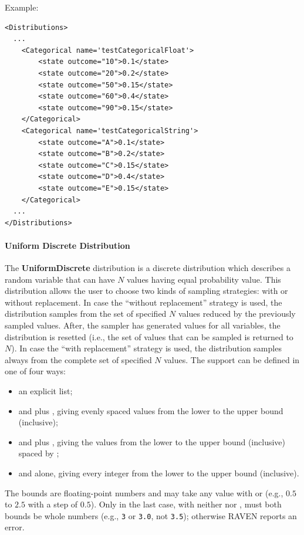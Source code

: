 Example:
\begin{lstlisting}[style=XML]
<Distributions>
  ...
    <Categorical name='testCategoricalFloat'>
        <state outcome="10">0.1</state>
        <state outcome="20">0.2</state>
        <state outcome="50">0.15</state>
        <state outcome="60">0.4</state>
        <state outcome="90">0.15</state>
    </Categorical>
    <Categorical name='testCategoricalString'>
        <state outcome="A">0.1</state>
        <state outcome="B">0.2</state>
        <state outcome="C">0.15</state>
        <state outcome="D">0.4</state>
        <state outcome="E">0.15</state>
    </Categorical>
  ...
</Distributions>
\end{lstlisting}

\paragraph{Uniform Discrete Distribution}
\label{subsec:UniformDiscrete}

The \textbf{UniformDiscrete} distribution is a discrete distribution which describes a random variable
that can have $N$ values having equal probability value.
This distribution allows the user to choose two kinds of sampling strategies: with or without replacement.
In case the ``without replacement'' strategy is used, the distribution samples from the set of specified $N$ values
reduced by the previously sampled values.
After, the sampler has generated values for all variables, the distribution is
resetted (i.e., the set of values that can be sampled is returned to $N$).
In case the ``with replacement'' strategy is used, the distribution samples always from the complete set of specified $N$ values.
The support can be defined in one of four ways:
\begin{itemize}
  \item an explicit  list;
  \item {} and  plus , giving 
        evenly spaced values from the lower to the upper bound (inclusive);
  \item {} and  plus , giving the values from the lower
        to the upper bound (inclusive) spaced by ;
  \item {} and  alone, giving every integer from the lower to the
        upper bound (inclusive).
\end{itemize}
The bounds are floating-point numbers and may take any value with  or 
(e.g., $0.5$ to $2.5$ with a step of $0.5$). Only in the last case, with neither  nor
, must both bounds be whole numbers (e.g., \texttt{3} or \texttt{3.0}, not \texttt{3.5});
otherwise RAVEN reports an error.

